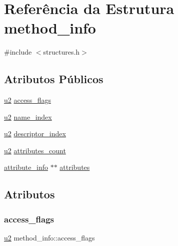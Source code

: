 \hypertarget{structmethod__info}{}\section{Referência da Estrutura method\+\_\+info}
\label{structmethod__info}


{\ttfamily \#include $<$structures.\+h$>$}

\subsection*{Atributos Públicos}
\begin{DoxyCompactItemize}
\item 
\hyperlink{lista__operandos_8h_a732cde1300aafb73b0ea6c2558a7a54f}{u2} \hyperlink{structmethod__info_a3b657027a141cdbc94ded28607c98be5}{access\+\_\+flags}
\item 
\hyperlink{lista__operandos_8h_a732cde1300aafb73b0ea6c2558a7a54f}{u2} \hyperlink{structmethod__info_ab91d62d0658b77bba83f6bb685e3bbb9}{name\+\_\+index}
\item 
\hyperlink{lista__operandos_8h_a732cde1300aafb73b0ea6c2558a7a54f}{u2} \hyperlink{structmethod__info_a7713103e0c8d060630ad62774fb9be37}{descriptor\+\_\+index}
\item 
\hyperlink{lista__operandos_8h_a732cde1300aafb73b0ea6c2558a7a54f}{u2} \hyperlink{structmethod__info_ad9e5e1e2fc850806addadd6deab8565d}{attributes\+\_\+count}
\item 
\hyperlink{structattribute__info}{attribute\+\_\+info} $\ast$$\ast$ \hyperlink{structmethod__info_ab6e323f51c4f05e92c09e3ac5e7e07dc}{attributes}
\end{DoxyCompactItemize}


\subsection{Atributos}
\mbox{\label{structmethod__info_a3b657027a141cdbc94ded28607c98be5}} 
\subsubsection{\texorpdfstring{access\+\_\+flags}{access\_flags}}
{\footnotesize\ttfamily \hyperlink{lista__operandos_8h_a732cde1300aafb73b0ea6c2558a7a54f}{u2} method\+\_\+info\+::access\+\_\+flags}

